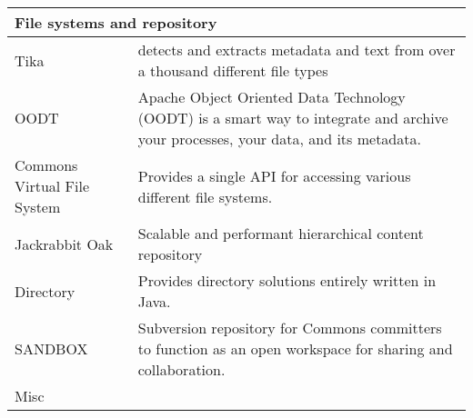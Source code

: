 {\begin{longtable}{|p{2cm} | p{14cm}|}
\hline
\multicolumn{2}{|l|}{File systems and repository} \\
\hline

Tika & detects and extracts metadata and text from over a thousand different file types
\\ OODT & Apache Object Oriented Data Technology (OODT) is a smart way to integrate and archive your processes, your data, and its metadata.
\\ Commons Virtual File System & Provides a single API for accessing various different file systems.
\\ Jackrabbit Oak & Scalable and performant hierarchical content repository
\\ Directory & Provides directory solutions entirely written in Java.
\\ SANDBOX & Subversion repository for Commons committers to function as an open workspace for sharing and collaboration. \\

\hline
\multicolumn{2}{|l|}{Misc} \\
\hline



\end{longtable}}
